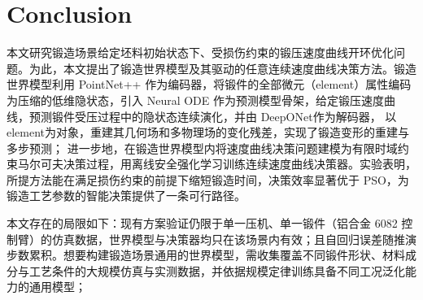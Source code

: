 \section{Conclusion}

本文研究锻造场景给定坯料初始状态下、受损伤约束的锻压速度曲线开环优化问题。为此，本文提出了锻造世界模型及其驱动的任意连续速度曲线决策方法。锻造世界模型利用 PointNet++ 作为编码器，将锻件的全部微元（element）属性编码为压缩的低维隐状态，引入 Neural ODE 作为预测模型骨架，给定锻压速度曲线，预测锻件受压过程中的隐状态连续演化，并由 DeepONet作为解码器，
以element为对象，重建其几何场和多物理场的变化残差，实现了锻造变形的重建与多步预测；
进一步地，在锻造世界模型内将速度曲线决策问题建模为有限时域约束马尔可夫决策过程，用离线安全强化学习训练连续速度曲线决策器。实验表明，所提方法能在满足损伤约束的前提下缩短锻造时间，决策效率显著优于 PSO，为锻造工艺参数的智能决策提供了一条可行路径。

本文存在的局限如下：现有方案验证仍限于单一压机、单一锻件（铝合金 6082 控制臂）的仿真数据，世界模型与决策器均只在该场景内有效；且自回归误差随推演步数累积。想要构建锻造场景通用的世界模型，需收集覆盖不同锻件形状、材料成分与工艺条件的大规模仿真与实测数据，并依据规模定律训练具备不同工况泛化能力的通用模型；

